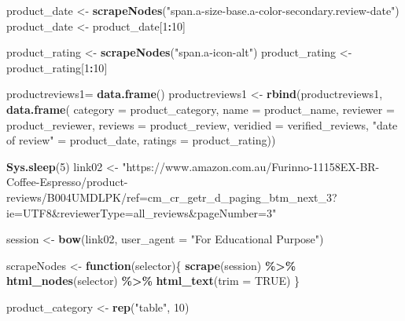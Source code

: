\documentclass[
]{article}
\newenvironment{Shaded}{\begin{snugshade}}{\end{snugshade}}
\newcommand{\AttributeTok}[1]{\textcolor[rgb]{0.13,0.29,0.53}{#1}}
\newcommand{\ConstantTok}[1]{\textcolor[rgb]{0.56,0.35,0.01}{#1}}
\newcommand{\ControlFlowTok}[1]{\textcolor[rgb]{0.13,0.29,0.53}{\textbf{#1}}}
\newcommand{\DecValTok}[1]{\textcolor[rgb]{0.00,0.00,0.81}{#1}}
\newcommand{\FunctionTok}[1]{\textcolor[rgb]{0.13,0.29,0.53}{\textbf{#1}}}
\newcommand{\NormalTok}[1]{#1}
\newcommand{\OtherTok}[1]{\textcolor[rgb]{0.56,0.35,0.01}{#1}}
\newcommand{\SpecialCharTok}[1]{\textcolor[rgb]{0.81,0.36,0.00}{\textbf{#1}}}
\newcommand{\StringTok}[1]{\textcolor[rgb]{0.31,0.60,0.02}{#1}}
\begin{document}
\begin{Shaded}
\begin{Highlighting}[]
\NormalTok{  product\_date }\OtherTok{\textless{}{-}} \FunctionTok{scrapeNodes}\NormalTok{(}\StringTok{"span.a{-}size{-}base.a{-}color{-}secondary.review{-}date"}\NormalTok{)}
\NormalTok{  product\_date }\OtherTok{\textless{}{-}}\NormalTok{ product\_date[}\DecValTok{1}\SpecialCharTok{:}\DecValTok{10}\NormalTok{]}
  
\NormalTok{  product\_rating }\OtherTok{\textless{}{-}} \FunctionTok{scrapeNodes}\NormalTok{(}\StringTok{"span.a{-}icon{-}alt"}\NormalTok{)}
\NormalTok{  product\_rating }\OtherTok{\textless{}{-}}\NormalTok{ product\_rating[}\DecValTok{1}\SpecialCharTok{:}\DecValTok{10}\NormalTok{]}
  
\NormalTok{  productreviews1}\OtherTok{=} \FunctionTok{data.frame}\NormalTok{()}
\NormalTok{  productreviews1 }\OtherTok{\textless{}{-}} \FunctionTok{rbind}\NormalTok{(productreviews1, }\FunctionTok{data.frame}\NormalTok{(}
                      \AttributeTok{category =}\NormalTok{ product\_category,}
                      \AttributeTok{name =}\NormalTok{ product\_name,}
                      \AttributeTok{reviewer =}\NormalTok{ product\_reviewer,}
                      \AttributeTok{reviews =}\NormalTok{ product\_review,}
                      \AttributeTok{veridied =}\NormalTok{ verified\_reviews,}
                      \StringTok{"date of review"} \OtherTok{=}\NormalTok{ product\_date,}
                      \AttributeTok{ratings =}\NormalTok{ product\_rating))}

  
 \FunctionTok{Sys.sleep}\NormalTok{(}\DecValTok{5}\NormalTok{)}
\NormalTok{link02 }\OtherTok{\textless{}{-}} \StringTok{"https://www.amazon.com.au/Furinno{-}11158EX{-}BR{-}Coffee{-}Espresso/product{-}reviews/B004UMDLPK/ref=cm\_cr\_getr\_d\_paging\_btm\_next\_3?ie=UTF8\&reviewerType=all\_reviews\&pageNumber=3"}


\NormalTok{  session }\OtherTok{\textless{}{-}} \FunctionTok{bow}\NormalTok{(link02,}
               \AttributeTok{user\_agent =} \StringTok{"For Educational Purpose"}\NormalTok{)}

\NormalTok{  scrapeNodes }\OtherTok{\textless{}{-}} \ControlFlowTok{function}\NormalTok{(selector)\{}
    \FunctionTok{scrape}\NormalTok{(session) }\SpecialCharTok{\%\textgreater{}\%}
      \FunctionTok{html\_nodes}\NormalTok{(selector) }\SpecialCharTok{\%\textgreater{}\%}
      \FunctionTok{html\_text}\NormalTok{(}\AttributeTok{trim =} \ConstantTok{TRUE}\NormalTok{)}
\NormalTok{  \}}

\NormalTok{  product\_category }\OtherTok{\textless{}{-}} \FunctionTok{rep}\NormalTok{(}\StringTok{"table"}\NormalTok{, }\DecValTok{10}\NormalTok{)}


\end{Highlighting}
\end{Shaded}
\end{document}
